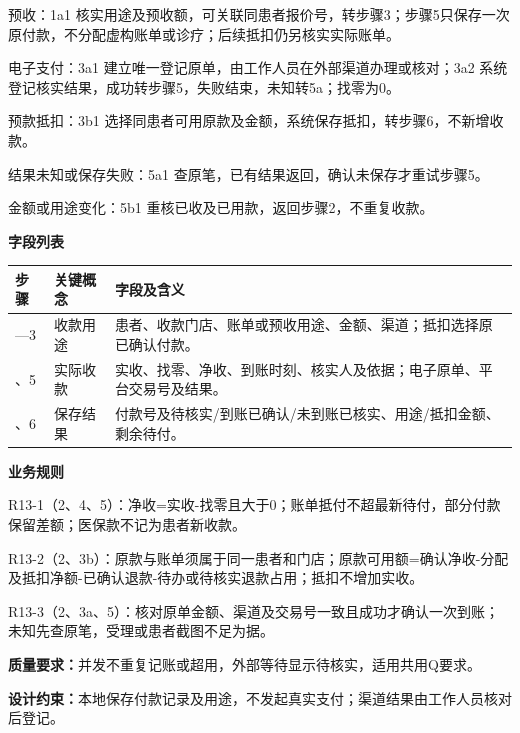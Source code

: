 \documentclass[UTF8,a4paper,zihao=-4,fontset=none]{ctexart}
\begin{document}
\begin{description}\setlength{\itemsep}{0pt}\setlength{\parsep}{0pt}\setlength{\topsep}{2pt}
\item[1a] 预收：1a1 核实用途及预收额，可关联同患者报价号，转步骤3；步骤5只保存一次原付款，不分配虚构账单或诊疗；后续抵扣仍另核实实际账单。
\item[3a] 电子支付：3a1 建立唯一登记原单，由工作人员在外部渠道办理或核对；3a2 系统登记核实结果，成功转步骤5，失败结束，未知转5a；找零为0。
\item[3b] 预款抵扣：3b1 选择同患者可用原款及金额，系统保存抵扣，转步骤6，不新增收款。
\item[5a] 结果未知或保存失败：5a1 查原笔，已有结果返回，确认未保存才重试步骤5。
\item[5b] 金额或用途变化：5b1 重核已收及已用款，返回步骤2，不重复收款。
\end{description}
\noindent\textbf{字段列表}\par
{\setlength{\tabcolsep}{3pt}\renewcommand{\arraystretch}{1.04}
\noindent\begin{tabular}{@{}>{\raggedright\arraybackslash}p{1.2cm}>{\raggedright\arraybackslash}p{2.2cm}>{\raggedright\arraybackslash}p{12.3cm}@{}}
\toprule
步骤 & 关键概念 & 字段及含义 \\ \midrule
1—3 & 收款用途 & 患者、收款门店、账单或预收用途、金额、渠道；抵扣选择原已确认付款。 \\
4、5 & 实际收款 & 实收、找零、净收、到账时刻、核实人及依据；电子原单、平台交易号及结果。 \\
5、6 & 保存结果 & 付款号及待核实/到账已确认/未到账已核实、用途/抵扣金额、剩余待付。 \\
\bottomrule
\end{tabular}\par}
\smallskip
\noindent\textbf{业务规则}\par
\noindent R13-1（2、4、5）：净收=实收-找零且大于0；账单抵付不超最新待付，部分付款保留差额；医保款不记为患者新收款。\par
\noindent R13-2（2、3b）：原款与账单须属于同一患者和门店；原款可用额=确认净收-分配及抵扣净额-已确认退款-待办或待核实退款占用；抵扣不增加实收。\par
\noindent R13-3（2、3a、5）：核对原单金额、渠道及交易号一致且成功才确认一次到账；未知先查原笔，受理或患者截图不足为据。\par
\smallskip
\noindent\textbf{质量要求：}并发不重复记账或超用，外部等待显示待核实，适用共用Q要求。\par
\noindent\textbf{设计约束：}本地保存付款记录及用途，不发起真实支付；渠道结果由工作人员核对后登记。\par
\endgroup
\clearpage
\end{document}
